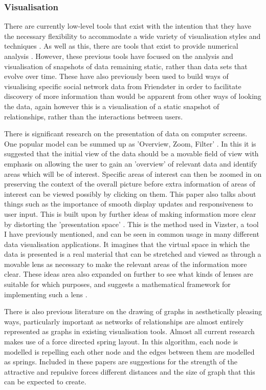 \documentclass[12pt,a4paper]{article}
\begin{document}
\subsubsection{Visualisation}
There are currently low-level tools that exist with the intention that they have the necessary flexibility to accommodate a wide variety of visualisation styles and techniques \cite{heer2005prefuse}. As well as this, there are tools that exist to provide numerical analysis \cite{borgatti2002ucinet}. However, these previous tools have focused on the analysis and visualisation of snapshots of data remaining static, rather than data sets that evolve over time. These have also previously been used to build ways of visualising specific social network data from Friendster \cite{heer2005vizster} in order to facilitate discovery of more information than would be apparent from other ways of looking the data, again however this is a visualisation of a static snapshot of relationships, rather than the interactions between users.

There is significant research on the presentation of data on computer screens. One popular model can be summed up as 'Overview, Zoom, Filter' \cite{shneiderman1996eyes}. In this it is suggested that the initial view of the data should be a movable field of view with emphasis on allowing the user to gain an 'overview' of relevant data and identify areas which will be of interest. Specific areas of interest can then be zoomed in on preserving the context of the overall picture before extra information of areas of interest can be viewed possibly by clicking on them. This paper also talks about things such as the importance of smooth display updates and responsiveness to user input. This is built upon by further ideas of making information more clear by distorting the 'presentation space' \cite{carpendale2001framework}. This is the method used in Vizster, a tool I have previously mentioned, and can be seen in common usage in many different data visualisation applications. It imagines that the virtual space in which the data is presented is a real material that can be stretched and viewed as through a movable lens as necessary to make the relevant areas of the information more clear. These ideas area also expanded on further to see what kinds of lenses are suitable for which purposes, and suggests a mathematical framework for implementing such a lens \cite{leung1994review}.

There is also previous literature on the drawing of graphs in aesthetically pleasing ways, particularly important as networks of relationships are almost entirely represented as graphs in existing visualisation tools. Almost all current research makes use of a force directed spring layout. In this algorithm, each node is modelled is repelling each other node and the edges between them are modelled as springs\cite{fruchterman1991graph}. Included in these papers are suggestions for the strength of the attractive and repulsive forces different distances and the size of graph that this can be expected to create.
\end{document}
